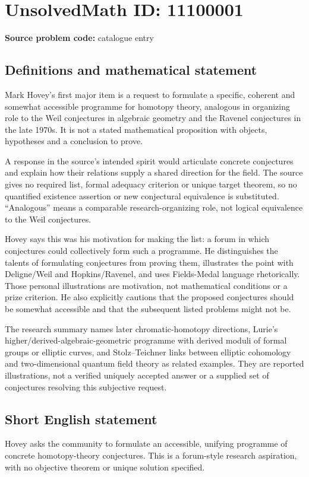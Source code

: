 \documentclass[11pt]{article}
\begin{document}
\section*{UnsolvedMath ID: 11100001}
\textbf{Source problem code:} catalogue entry
\subsection{Definitions and mathematical statement}
Mark Hovey's first major item is a request to formulate a specific, coherent and somewhat accessible programme for homotopy theory, analogous in organizing role to the Weil conjectures in algebraic geometry and the Ravenel conjectures in the late 1970s. It is not a stated mathematical proposition with objects, hypotheses and a conclusion to prove.

A response in the source's intended spirit would articulate concrete conjectures and explain how their relations supply a shared direction for the field. The source gives no required list, formal adequacy criterion or unique target theorem, so no quantified existence assertion or new conjectural equivalence is substituted. ``Analogous'' means a comparable research-organizing role, not logical equivalence to the Weil conjectures.

Hovey says this was his motivation for making the list: a forum in which conjectures could collectively form such a programme. He distinguishes the talents of formulating conjectures from proving them, illustrates the point with Deligne/Weil and Hopkins/Ravenel, and uses Fields-Medal language rhetorically. Those personal illustrations are motivation, not mathematical conditions or a prize criterion. He also explicitly cautions that the proposed conjectures should be somewhat accessible and that the subsequent listed problems might not be.

The research summary names later chromatic-homotopy directions, Lurie's higher/derived-algebraic-geometric programme with derived moduli of formal groups or elliptic curves, and Stolz--Teichner links between elliptic cohomology and two-dimensional quantum field theory as related examples. They are reported illustrations, not a verified uniquely accepted answer or a supplied set of conjectures resolving this subjective request.
\subsection{Short English statement}
Hovey asks the community to formulate an accessible, unifying programme of concrete homotopy-theory conjectures. This is a forum-style research aspiration, with no objective theorem or unique solution specified.
\end{document}
